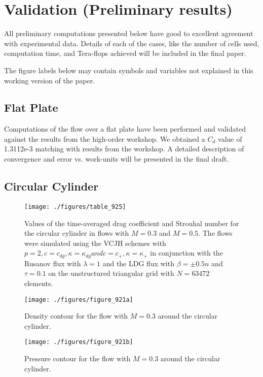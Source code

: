 \section{Validation (Preliminary results)}
\label{sec:validation}

All preliminary computations presented below have good to excellent agreement with experimental data. Details of each of the cases, like the number of cells used, computation time, and Tera-flops achieved will be included in the final paper.

The figure labels below may contain symbols and variables not explained in this working version of the paper.

\subsection{Flat Plate}
Computations of the flow over a flat plate have been performed and validated against the results from the high-order workshop. We obtained a $C_{d}$ value of 1.3112e-3 matching with results from the workshop. A detailed description of convergence and error vs. work-units will be presented in the final draft.  

\subsection{Circular Cylinder}
\begin{figure}
\centering
\texttt{[image: ./figures/table\_925]} \\
\caption{Values of the time-averaged drag coefficient and Strouhal number for the circular cylinder in flows with $M = 0.3$ and $M = 0.5$. The flows were simulated using the VCJH schemes with $p = 2, c = c_{dg}, \kappa = \kappa_{dg} and c = c_+, \kappa = \kappa_+$ in conjunction with the Rusanov flux with $\lambda = 1$ and the LDG flux with $\beta = ±0.5n$ and $\tau = 0.1$ on the unstructured triangular grid with $N = 63472$ elements.}
\label{fig:table_925}
\end{figure}

\begin{figure}
\centering
\texttt{[image: ./figures/figure\_921a]} \\
\caption{Density contour for the flow with $M = 0.3$ around the circular cylinder.}
\label{fig:figure_921a}
\end{figure}

\begin{figure}
\centering
\texttt{[image: ./figures/figure\_921b]} \\
\caption{Pressure contour for the flow with $M = 0.3$ around the circular cylinder.}
\label{fig:figure_921b}
\end{figure}

